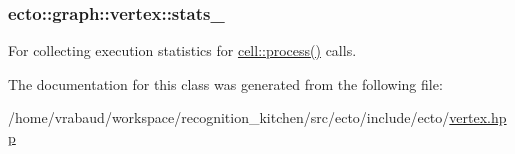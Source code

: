 \subsubsection[{\texorpdfstring{stats\+\_\+}{stats_}}]{ ecto\+::graph\+::vertex\+::stats\+\_\+\hspace{0.3cm}{\ttfamily [private]}}\hypertarget{classecto_1_1graph_1_1vertex_abf79016904200297ba32e42534c8ac53}{}\label{classecto_1_1graph_1_1vertex_abf79016904200297ba32e42534c8ac53}


For collecting execution statistics for \hyperlink{structecto_1_1cell_a6b810671ee21f5dddbc1206abfb999f3}{cell\+::process()} calls. 



The documentation for this class was generated from the following file\+:\begin{DoxyCompactItemize}
\item 
/home/vrabaud/workspace/recognition\+\_\+kitchen/src/ecto/include/ecto/\hyperlink{vertex_8hpp}{vertex.\+hpp}\end{DoxyCompactItemize}
